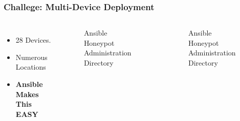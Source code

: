 \begin{frame}
\frametitle{Challege: Multi-Device Deployment}

\begin{columns}
\begin{itemize}
    \item 28 Devices.
    \item Numerous Locations
    \item{\textbf{Ansible Makes This EASY}}
\end{itemize}

\begin{figure}[b]
\caption{Ansible Honeypot Administration Directory}
\end{figure}

\begin{figure}[H]
\caption{Ansible Honeypot Administration Directory}
\end{figure}

\end{columns}

\end{frame}
